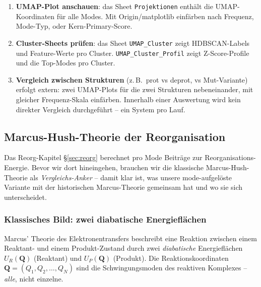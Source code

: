 \documentclass[11pt,a4paper,twoside]{article}
\theoremstyle{remark}
\begin{document}
\begin{enumerate}
  \item \textbf{UMAP-Plot anschauen}: das Sheet
        \texttt{Projektionen} enth\"alt die UMAP-Koordinaten f\"ur
        alle Modes. Mit Origin/matplotlib einf\"arben nach Frequenz,
        Mode-Typ, oder Kern-Primary-Score.

  \item \textbf{Cluster-Sheets pr\"ufen}: das Sheet
        \texttt{UMAP\_Cluster} zeigt HDBSCAN-Labels und
        Feature-Werte pro Cluster. \texttt{UMAP\_Cluster\_Profil}
        zeigt Z-Score-Profile und die Top-Modes pro Cluster.

  \item \textbf{Vergleich zwischen Strukturen} (z.\,B.\ prot vs deprot,
        vs Mut-Variante) erfolgt extern: zwei UMAP-Plots f\"ur die
        zwei Strukturen nebeneinander, mit gleicher Frequenz-Skala
        einf\"arben. Innerhalb einer Auswertung wird kein direkter
        Vergleich durchgef\"uhrt -- ein System pro Lauf.
\end{enumerate}




\subsection{Marcus-Hush-Theorie der Reorganisation}
\label{sec:marcus-hush}

Das Reorg-Kapitel \S\ref{sec:reorg} berechnet pro Mode Beitr\"age zur
Reorganisations-Energie. Bevor wir dort hineingehen, brauchen wir die
klassische Marcus-Hush-Theorie als \emph{Vergleichs-Anker} -- damit klar
ist, was unsere mode-aufgel\"oste Variante mit der historischen
Marcus-Theorie gemeinsam hat und wo sie sich unterscheidet.

\subsubsection*{Klassisches Bild: zwei diabatische Energiefl\"achen}

Marcus' Theorie des Elektronentransfers \cite{Marcus1956,Marcus1993}
beschreibt eine Reaktion zwischen einem Reaktant- und einem
Produkt-Zustand durch zwei \emph{diabatische} Energiefl\"achen
$U_R(\mathbf{Q})$ (Reaktant) und $U_P(\mathbf{Q})$ (Produkt). Die
Reaktionskoordinaten $\mathbf{Q} = (Q_1, Q_2, \ldots, Q_N)$ sind die
Schwingungsmoden des reaktiven Komplexes -- \emph{alle}, nicht
einzelne.
\end{document}

